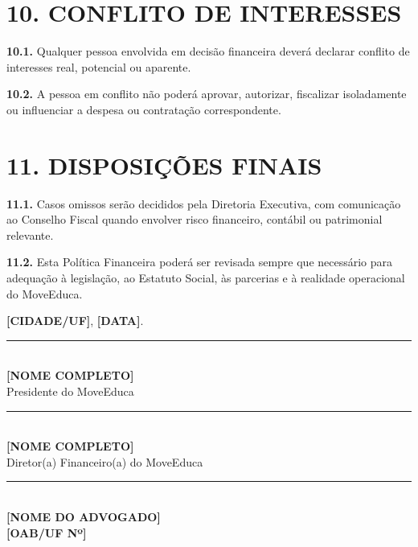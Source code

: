 \documentclass[11pt,a4paper]{article}
\begin{document}
\section*{10. CONFLITO DE INTERESSES}

\textbf{10.1.} Qualquer pessoa envolvida em decisão financeira deverá declarar conflito de interesses real, potencial ou aparente.

\textbf{10.2.} A pessoa em conflito não poderá aprovar, autorizar, fiscalizar isoladamente ou influenciar a despesa ou contratação correspondente.

\section*{11. DISPOSIÇÕES FINAIS}

\textbf{11.1.} Casos omissos serão decididos pela Diretoria Executiva, com comunicação ao Conselho Fiscal quando envolver risco financeiro, contábil ou patrimonial relevante.

\textbf{11.2.} Esta Política Financeira poderá ser revisada sempre que necessário para adequação à legislação, ao Estatuto Social, às parcerias e à realidade operacional do MoveEduca.

\vspace{2cm}
\begin{center}
\textbf{[CIDADE/UF]}, \textbf{[DATA]}.

\vspace{2cm}
\rule{8cm}{0.4pt}\\
\textbf{[NOME COMPLETO]}\\
Presidente do MoveEduca

\vspace{1.5cm}
\rule{8cm}{0.4pt}\\
\textbf{[NOME COMPLETO]}\\
Diretor(a) Financeiro(a) do MoveEduca

\vspace{1.5cm}
\rule{8cm}{0.4pt}\\
\textbf{[NOME DO ADVOGADO]}\\
\textbf{[OAB/UF Nº]}
\end{center}
\end{document}
